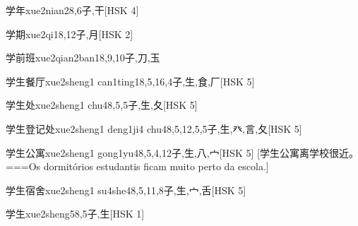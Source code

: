 \begin{EntryWithPhonetic}{学年}{xue2nian2}{8,6}{⼦,⼲}[HSK 4]
\end{EntryWithPhonetic}

\begin{EntryWithPhonetic}{学期}{xue2qi1}{8,12}{⼦,⽉}[HSK 2]
\end{EntryWithPhonetic}

\begin{EntryWithPhonetic}{学前班}{xue2qian2ban1}{8,9,10}{⼦,⼑,⽟}
\end{EntryWithPhonetic}

\begin{EntryWithPhonetic}{学生餐厅}{xue2sheng1 can1ting1}{8,5,16,4}{⼦,⽣,⾷,⼚}[HSK 5]
\end{EntryWithPhonetic}

\begin{EntryWithPhonetic}{学生处}{xue2sheng1 chu4}{8,5,5}{⼦,⽣,⼡}[HSK 5]
\end{EntryWithPhonetic}

\begin{EntryWithPhonetic}{学生登记处}{xue2sheng1 deng1ji4 chu4}{8,5,12,5,5}{⼦,⽣,⽨,⾔,⼡}[HSK 5]
\end{EntryWithPhonetic}

\begin{EntryWithPhonetic}{学生公寓}{xue2sheng1 gong1yu4}{8,5,4,12}{⼦,⽣,⼋,⼧}[HSK 5]
  [学生公寓离学校很近。===Os dormitórios estudantis ficam muito perto da escola.]
\end{EntryWithPhonetic}

\begin{EntryWithPhonetic}{学生宿舍}{xue2sheng1 su4she4}{8,5,11,8}{⼦,⽣,⼧,⾆}[HSK 5]
\end{EntryWithPhonetic}

\begin{EntryWithPhonetic}{学生}{xue2sheng5}{8,5}{⼦,⽣}[HSK 1]
\end{EntryWithPhonetic}

